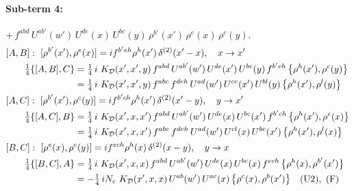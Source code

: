 \documentclass[10pt]{article}
\numberwithin{equation}{section}
\begin{document}
\paragraph{Sub-term 4:} $+\,f^{abd}\,U^{ab'}(w')\,U^{de}(x)\,U^{bc}(y)\,\rho^{b'}(x')\,\rho^{e}(x)\,\rho^{c}(y)$.
\begin{align}
&[A,B]:\ [\rho^{b'}(x'),\rho^{e}(x)]=i f^{b'eh}\rho^{h}(x')\,\delta^{(2)}(x'-x),\quad x\to x'\notag\\
&\qquad \tfrac14\{[A,B],C\}=\tfrac14\,i\,\,K_{\mathcal D}(x',x',y)\,f^{abd}\,U^{ab'}(w')\,U^{de}(x')\,U^{bc}(y)\,f^{b'eh}\,\big\{\rho^{h}(x'),\rho^{c}(y)\big\}\notag\\
&\qquad\phantom{\tfrac14\{[A,B],C\}}=\tfrac14\,i\,\,K_{\mathcal D}(x',x',y)\,f^{abc}\,f^{deh}\,U^{ad}(w')\,U^{ce}(x')\,U^{bl}(y)\,\big\{\rho^{h}(x'),\rho^{l}(y)\big\}
\label{eq:D-4-AB}\\
&[A,C]:\ [\rho^{b'}(x'),\rho^{c}(y)]=i f^{b'ch}\rho^{h}(x')\,\delta^{(2)}(x'-y),\quad y\to x'\notag\\
&\qquad \tfrac14\{[A,C],B\}=\tfrac14\,i\,\,K_{\mathcal D}(x',x,x')\,f^{abd}\,U^{ab'}(w')\,U^{de}(x)\,U^{bc}(x')\,f^{b'ch}\,\big\{\rho^{h}(x'),\rho^{e}(x)\big\}\notag\\
&\qquad\phantom{\tfrac14\{[A,C],B\}}=\tfrac14\,i\,\,K_{\mathcal D}(x',x,x')\,f^{abc}\,f^{deh}\,U^{ad}(w')\,U^{cl}(x)\,U^{be}(x')\,\big\{\rho^{h}(x'),\rho^{l}(x)\big\}
\label{eq:D-4-AC}\\
&[B,C]:\ [\rho^{e}(x),\rho^{c}(y)]=i f^{ech}\rho^{h}(x)\,\delta^{(2)}(x-y),\quad y\to x\notag\\
&\qquad \tfrac14\{[B,C],A\}=\tfrac14\,i\,\,K_{\mathcal D}(x',x,x)\,f^{abd}\,U^{ab'}(w')\,U^{de}(x)\,U^{bc}(x)\,f^{ech}\,\big\{\rho^{h}(x),\rho^{b'}(x')\big\}\notag\\
&\qquad\phantom{\tfrac14\{[B,C],A\}}=-\tfrac14\,i N_{c}\,\,K_{\mathcal D}(x',x,x)\,U^{ab}(w')\,U^{ac}(x)\,\big\{\rho^{c}(x),\rho^{b}(x')\big\}\quad\text{(U2)},\ \text{(F)}
\label{eq:D-4-BC}
\end{align}
\end{document}
